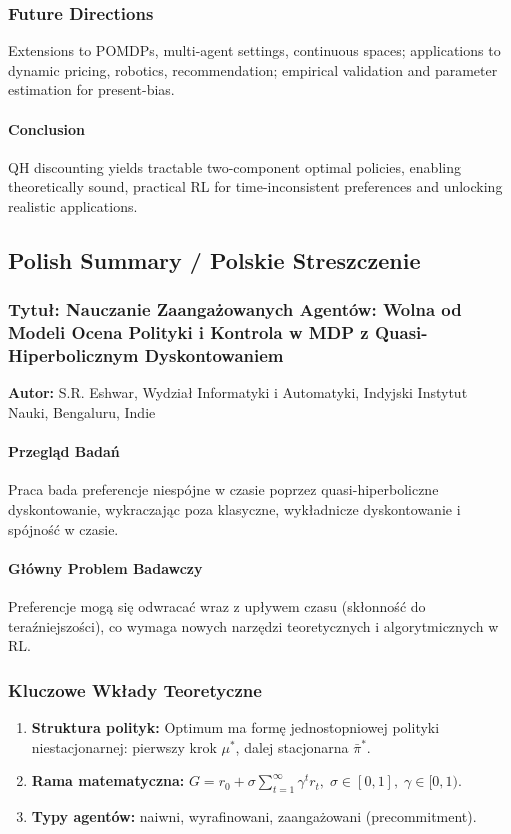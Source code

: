 \subsubsection*{Future Directions}
Extensions to POMDPs, multi-agent settings, continuous spaces; applications to dynamic pricing, robotics, recommendation; empirical validation and parameter estimation for present-bias.

\paragraph{Conclusion}
QH discounting yields tractable two-component optimal policies, enabling theoretically sound, practical RL for time-inconsistent preferences and unlocking realistic applications.

\bigskip
\subsection*{Polish Summary / Polskie Streszczenie}
\subsubsection*{Tytuł: Nauczanie Zaangażowanych Agentów: Wolna od Modeli Ocena Polityki i Kontrola w MDP z Quasi-Hiperbolicznym Dyskontowaniem}
\textbf{Autor:} S.R. Eshwar, Wydział Informatyki i Automatyki, Indyjski Instytut Nauki, Bengaluru, Indie

\paragraph{Przegląd Badań}
Praca bada preferencje niespójne w czasie poprzez quasi-hiperboliczne dyskontowanie, wykraczając poza klasyczne, wykładnicze dyskontowanie i spójność w czasie.

\paragraph{Główny Problem Badawczy}
Preferencje mogą się odwracać wraz z upływem czasu (skłonność do teraźniejszości), co wymaga nowych narzędzi teoretycznych i algorytmicznych w RL.

\subsubsection*{Kluczowe Wkłady Teoretyczne}
\begin{enumerate}
  \item \textbf{Struktura polityk:} Optimum ma formę jednostopniowej polityki niestacjonarnej: pierwszy krok $\mu^*$, dalej stacjonarna $\bar{\pi}^*$.
  \item \textbf{Rama matematyczna:}
  \(
    G = r_0 + \sigma \sum_{t=1}^{\infty} \gamma^t r_t,\; \sigma\in[0,1],\; \gamma\in[0,1)
  \).
  \item \textbf{Typy agentów:} naiwni, wyrafinowani, zaangażowani (precommitment).
\end{enumerate}

